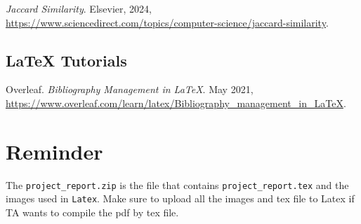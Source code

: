 \documentclass[fontsize=11pt]{article}
\begin{document}
\noindent
\textit{Jaccard Similarity}. Elsevier, 2024, \\\url{https://www.sciencedirect.com/topics/computer-science/jaccard-similarity}.

\bigskip

\subsection*{LaTeX Tutorials}

\noindent
Overleaf. \textit{Bibliography Management in LaTeX}. May 2021, \\\url{https://www.overleaf.com/learn/latex/Bibliography_management_in_LaTeX}.




\bigskip

\section*{Reminder}

The \texttt{project\_report.zip} is the file that contains \texttt{project\_report.tex} and the images used in \texttt{Latex}. Make sure to upload all the images and tex file to Latex if TA wants to compile the pdf by tex file. 
\end{document}
